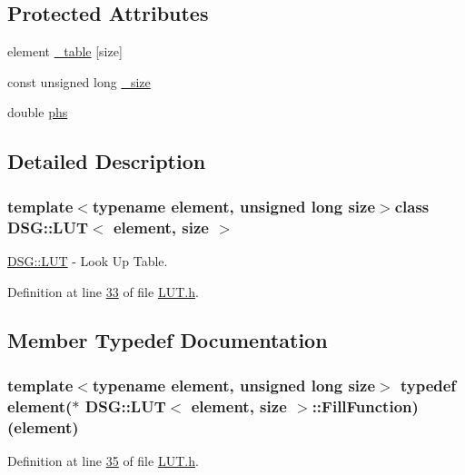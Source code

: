 \subsection*{Protected Attributes}
\begin{DoxyCompactItemize}
\item 
element \hyperlink{class_d_s_g_1_1_l_u_t_ac8b23bbb7ce259d4ceb1c6fa93a7f29f}{\+\_\+table} \mbox{[}size\mbox{]}
\item 
const unsigned long \hyperlink{class_d_s_g_1_1_l_u_t_a87c352b5eaea2188955213c0f4ae9799}{\+\_\+size}
\item 
double \hyperlink{class_d_s_g_1_1_l_u_t_a9ab8f8e89346c759e06f6d76c5b816cc}{phs}
\end{DoxyCompactItemize}


\subsection{Detailed Description}
\subsubsection*{template$<$typename element, unsigned long size$>$class D\+S\+G\+::\+L\+U\+T$<$ element, size $>$}

\hyperlink{class_d_s_g_1_1_l_u_t}{D\+S\+G\+::\+L\+U\+T} -\/ Look Up Table. 

Definition at line \hyperlink{_l_u_t_8h_source_l00033}{33} of file \hyperlink{_l_u_t_8h_source}{L\+U\+T.\+h}.



\subsection{Member Typedef Documentation}
\hypertarget{class_d_s_g_1_1_l_u_t_af2436acdd3f277cc4cac77c3c07cb4ca}{
\subsubsection[{Fill\+Function}]{\setlength{\rightskip}{0pt plus 5cm}template$<$typename element, unsigned long size$>$ typedef element($\ast$ {\bf D\+S\+G\+::\+L\+U\+T}$<$ element, size $>$\+::Fill\+Function)(element)}}\label{class_d_s_g_1_1_l_u_t_af2436acdd3f277cc4cac77c3c07cb4ca}


Definition at line \hyperlink{_l_u_t_8h_source_l00035}{35} of file \hyperlink{_l_u_t_8h_source}{L\+U\+T.\+h}.

